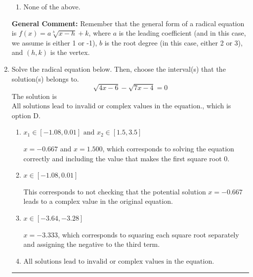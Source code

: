 \documentclass{extbook}[14pt]
\newcommand{\litem}[1]{\item #1

\rule{\textwidth}{0.4pt}}
\begin{document}
\begin{enumerate}
{\begin{enumerate}[label=\Alph*.]
\item None of the above.\end{enumerate}
\textbf{General Comment:} Remember that the general form of a radical equation is $ f(x) = a \sqrt[b]{x - h} + k $, where $a$ is the leading coefficient (and in this case, we assume is either 1 or -1), $b$ is the root degree (in this case, either 2 or 3), and $(h, k)$ is the vertex.
}
\litem{
Solve the radical equation below. Then, choose the interval(s) that the solution(s) belongs to.
\[ \sqrt{4 x - 6} - \sqrt{7 x - 4} = 0 \]The solution is \( \text{All solutions lead to invalid or complex values in the equation.} \), which is option D.\begin{enumerate}[label=\Alph*.]
\item \( x_1 \in [-1.08, 0.01] \text{ and } x_2 \in [1.5,3.5] \)

$x = -0.667$ and $x = 1.500$, which corresponds to solving the equation correctly and including the value that makes the first square root 0.
\item \( x \in [-1.08,0.01] \)

This corresponds to not checking that the potential solution $x = -0.667$ leads to a complex value in the original equation.
\item \( x \in [-3.64,-3.28] \)

$x = -3.333$, which corresponds to squaring each square root separately and assigning the negative to the third term.
\item \( \text{All solutions lead to invalid or complex values in the equation.} \)


\end{enumerate}}
\end{enumerate}
\end{document}
